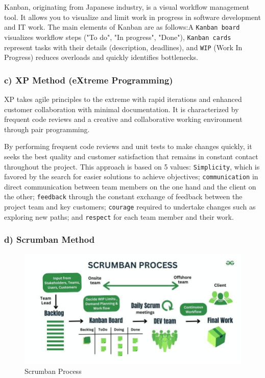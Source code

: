 Kanban, originating from Japanese industry, is a visual workflow management tool. It allows you to visualize and limit work in progress in software development and IT work\cite{anderson2010kanban}. The main elements of Kanban are as follows:A \texttt{Kanban board} visualizes workflow steps ("To do", "In progress", "Done"), \texttt{Kanban cards} represent tasks with their details (description, deadlines), and \texttt{WIP} (Work In Progress) reduces overloads and quickly identifies bottlenecks.

\subsubsection{c) XP Method (eXtreme Programming)}

XP takes agile principles to the extreme with rapid iterations and enhanced customer collaboration with minimal documentation. It is characterized by frequent code reviews and a creative and collaborative working environment through pair programming\cite{beck2000extreme}. 


By performing frequent code reviews and unit tests to make changes quickly, it seeks the best quality and customer satisfaction that remains in constant contact throughout the project. This approach is based on 5 values: \texttt{Simplicity}, which is favored by the search for easier solutions to achieve objectives; \texttt{communication} in direct communication between team members on the one hand and the client on the other; \texttt{feedback} through the constant exchange of feedback between the project team and key customers; \texttt{courage} required to undertake changes such as exploring new paths; and \texttt{respect} for each team member and their work.


\subsubsection{d) Scrumban Method}

\begin{center}
\begin{figure}[H]
            \centering
            \includegraphics[scale=0.44]{images/scrumban.jpg}
            \caption{Scrumban Process }
            \label{fig:Scrumban_Process}
\end{figure}
\end{center}

